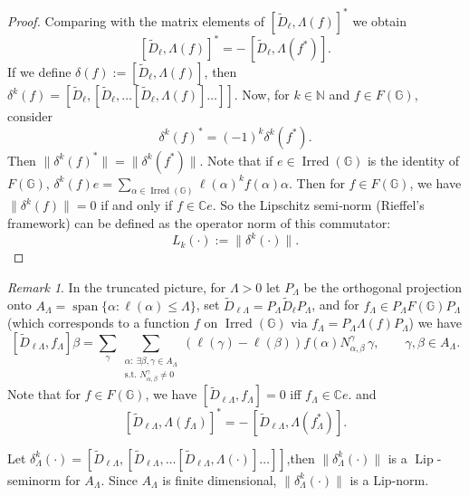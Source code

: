 \documentclass[12pt, reqno]{amsart}
\theoremstyle{definition}
\theoremstyle{remark}
\newtheorem{remark}[theorem]{Remark}
\numberwithin{equation}{section}
\begin{document}
\begin{proof}
    Comparing with the matrix elements of \([\tilde{D}_\ell,\Lambda(f)]^*\) we obtain
    \[
    [\tilde{D}_\ell,\Lambda(f)]^* = -\,[\tilde{D}_\ell,\Lambda(f^*)].
    \]
    If we define \(\delta(f):=[\tilde{D}_\ell,\Lambda(f)]\), then 
    \(\delta^k(f)= [\tilde{D}_\ell, [\tilde{D}_\ell, \dots 
    [\tilde{D}_\ell,\Lambda(f)]\dots ]]\).
    Now, for \(k \in \mathbb{N}\) and \(f \in  F(\mathbb{G})\), consider
    \[
    \delta^k(f)^* = (-1)^k \delta^k(f^*) .
    \]
    Then \(\|\delta^k(f)^*\| = \|\delta^k(f^*)\|\).
    Note that if \(e\in\operatorname{Irred}(\mathbb{G})\) is the identity of 
    \(F(\mathbb{G})\), 
    \(\delta^k(f)e = \sum_{\alpha\in\operatorname{Irred}(\mathbb{G})} 
    \ell(\alpha)^k f(\alpha)\alpha\).
    Then for \(f\in F(\mathbb{G})\), we have \(\|\delta^k(f)\|=0\) if and only if 
    \(f\in \mathbb{C}e\).
    So the Lipschitz semi‑norm (Rieffel's framework) can be defined as the 
    operator norm of this commutator:
    \[
    L_k(\cdot) := \|\delta^k(\cdot)\|.
    \]
\end{proof}

\begin{remark}
    In the truncated picture, for \(\Lambda>0\) let \(P_\Lambda\) be the 
    orthogonal projection onto 
    \(A_\Lambda = \operatorname{span}\{\alpha: \ell(\alpha)\le\Lambda\}\),
    set \(\tilde{D}_{\ell\Lambda}=P_\Lambda\tilde{D}_\ell P_\Lambda\), and for 
    \(f_\Lambda\in P_\Lambda F(\mathbb{G})P_\Lambda\) (which corresponds to a 
    function \(f\) on \(\operatorname{Irred}(\mathbb{G})\) via 
    \(f_\Lambda = P_\Lambda\Lambda(f)P_\Lambda\)) we have
    \[
    [\tilde{D}_{\ell\Lambda},f_\Lambda]\beta =
    \sum_\gamma \sum_{\substack{\alpha:\ \exists\beta,\gamma\in A_\Lambda \\
    \text{s.t. } N_{\alpha,\beta}^{\gamma}\neq 0}}
    (\ell(\gamma)-\ell(\beta)) f(\alpha) N_{\alpha,\beta}^{\gamma} \,\gamma,
    \qquad \gamma,\beta\in A_\Lambda.
    \]
    Note that for \(f\in F(\mathbb{G})\), we have 
    \([\tilde{D}_{\ell\Lambda},f_\Lambda]=0\) iff \(f_\Lambda\in \mathbb{C}e\).
    and 
    \[
    [\tilde{D}_{\ell\Lambda},\Lambda(f_\Lambda)]^* = -\,[\tilde{D}_{\ell\Lambda},\Lambda(f_\Lambda^*)].
    \]
    
   Let $\delta_\Lambda^k(\cdot) =
    [ \tilde{D}_{\ell\Lambda},
      [ \tilde{D}_{\ell\Lambda},
        \dots [ \tilde{D}_{\ell\Lambda},
          \Lambda(\cdot)]
         \dots ] ]$,then
 $\|\delta_\Lambda^k(\cdot)\|$ is a \(\operatorname{Lip}\)-seminorm for \(A_\Lambda\). Since \(A_\Lambda\) 
    is finite dimensional, \(\|\delta_\Lambda^k(\cdot)\|\) is a Lip-norm.
\end{remark}
\end{document}
